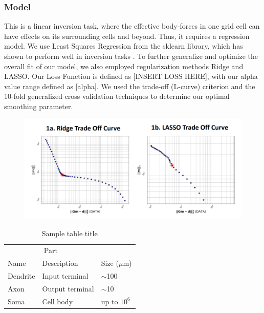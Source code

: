 \documentclass{article}
\begin{document}
\subsubsection{Model}

This is a linear inversion task, where the effective body-forces in one grid cell can have effects on its surrounding cells and beyond. Thus, it requires a regression model. We use Least Squares Regression from the sklearn library, which has shown to perform well in inversion tasks \cite{lines_review_1984}. To further generalize and optimize the overall fit of our model, we also employed regularization methods Ridge and LASSO. Our Loss Function is defined as [INSERT LOSS HERE], with our alpha value range defined as [alpha]. We used the trade-off (L-curve) criterion and the 10-fold generalized cross validation techniques to determine our optimal smoothing parameter. 

\begin{figure}
    \includegraphics[width=0.8 * \columnwidth]{figures/trade-off-curves.pdf}
\end{figure}

\begin{table}
  \caption{Sample table title}
  \label{sample-table}
  \centering
  \begin{tabular}{lll}
    \toprule
    \multicolumn{2}{c}{Part}                   \\
    \cmidrule(r){1-2}
    Name     & Description     & Size ($\mu$m) \\
    \midrule
    Dendrite & Input terminal  & $\sim$100     \\
    Axon     & Output terminal & $\sim$10      \\
    Soma     & Cell body       & up to $10^6$  \\
    \bottomrule
  \end{tabular}
\end{table}
\end{document}
